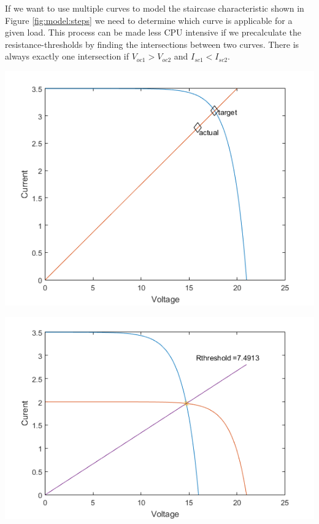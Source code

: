 If we want to use multiple curves to model the staircase characteristic shown in
Figure \ref{fig:model:steps} we  need to determine which curve is applicable for
a given load. This process can be made less CPU intensive if we precalculate the
resistance-thresholds by finding the intersections between two curves.  There is
always exactly one intersection if  $V_{oc1} > V_{oc2}$ and $I_{sc1} < I_{sc2}$.

\begin{minipage}{0.5\textwidth}
	\center
    \includegraphics[width=.95\textwidth]{images/model/approx.png}
    \label{fig:model:approx}
\end{minipage}
\begin{minipage}{0.5\textwidth}
	\center
    \includegraphics[width=.95\textwidth]{images/model/threshold.png}
    \label{fig:model:threshold}
\end{minipage}
